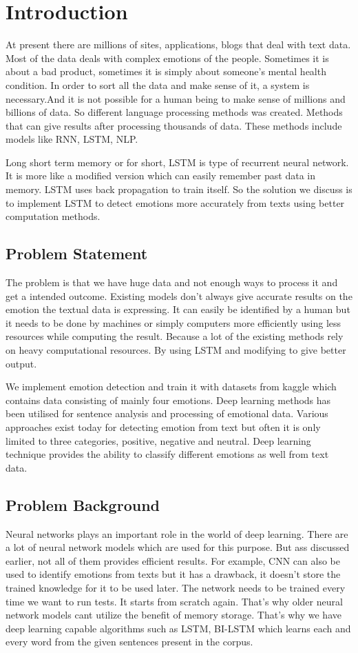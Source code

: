 \chapter{Introduction}\label{intro}
 At present there are millions of sites, applications, blogs that deal with text data. Most of the data deals with complex emotions of the people. Sometimes it is about a bad product, sometimes it is simply about someone's mental health condition. In order to sort all the data and make sense of it, a system is necessary.And it is not possible for a human being to make sense of millions and billions of data. So different language processing methods was created. Methods that can give results after processing thousands of data. These methods include models like RNN, LSTM, NLP.

Long short term memory or for short, LSTM is type of recurrent neural network. It is more like a modified version which can easily remember past data in memory. LSTM uses back propagation to train itself. So the solution we discuss is to implement LSTM to detect emotions more accurately from texts using better computation methods. 

\section{Problem Statement}
The problem is that we have huge data and not enough ways to process it and get a intended outcome. Existing models don't always give accurate results on the emotion the textual data is expressing. It can easily be identified by a human but it needs to be done by machines or simply computers more efficiently using less resources while computing the result. Because a lot of the existing methods rely on heavy computational resources. By using LSTM and modifying to give better output. 

We implement emotion detection and train it with datasets from kaggle which contains data consisting of mainly four emotions. Deep learning methods has been utilised for sentence analysis and processing of emotional data. Various approaches exist today for detecting emotion from text but often it is only limited to three categories, positive, negative and neutral. Deep learning technique provides the ability to classify different emotions as well from text data.
\section{Problem Background}
Neural networks plays an important role in the world of deep learning. There are a lot of neural network models which are used for this purpose. But ass discussed earlier, not all of them provides efficient results. For example, CNN can also be used to identify emotions from texts but it has a drawback, it doesn't store the trained knowledge for it to be used later. The network needs to be trained every time we want to run tests. It starts from scratch again. That's why older neural network models cant utilize the benefit of memory storage. That's why we have deep learning capable algorithms such as LSTM, BI-LSTM which learns each and every word from the given sentences present in the corpus.   

